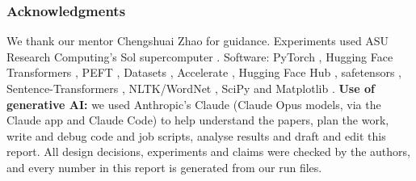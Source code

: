 \documentclass{article}
\begin{document}
\subsubsection*{Acknowledgments}
We thank our mentor Chengshuai Zhao for guidance. Experiments used ASU Research Computing's Sol supercomputer
\citep{jennewein2023sol}. Software: PyTorch \citep{paszke2019pytorch}, Hugging Face Transformers
\citep{wolf2020transformers}, PEFT \citep{mangrulkar2022peft}, Datasets \citep{lhoest2021datasets},
Accelerate \citep{gugger2022accelerate}, Hugging Face Hub \citep{hf2020hub}, safetensors \citep{hf2022safetensors}, Sentence-Transformers \citep{reimers2019sbert}, NLTK/WordNet
\citep{bird2009nltk,miller1995wordnet}, SciPy \citep{virtanen2020scipy} and Matplotlib \citep{hunter2007matplotlib}.
\textbf{Use of generative AI:} we used Anthropic's Claude (Claude Opus models, via the Claude app and Claude Code) to help
understand the papers, plan the work, write and debug code and job scripts, analyse results and draft and edit this
report. All design decisions, experiments and claims were checked by the authors, and every number in this report is
generated from our run files.



\end{document}
